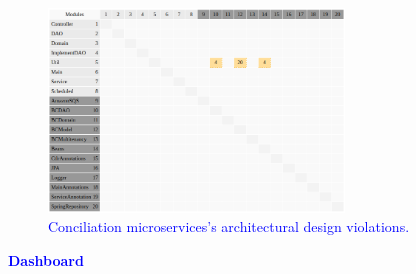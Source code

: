\documentclass[12pt]{article}
\begin{document}
\begin{figure}[ht]
\centering
\includegraphics[width=0.7\textwidth]{figuras/violacoesConciliation.png}
\vspace{-0.3cm}
\caption{\textcolor{blue}{Conciliation microservices's architectural design violations.}}
\label{fig:microservices}
\end{figure}

\newpage
\noindent\textbf{\large{\textcolor{blue}{Dashboard}}}
\label{sec:ApendiceDashboard}
\vspace{-0.3cm}

\end{document}

